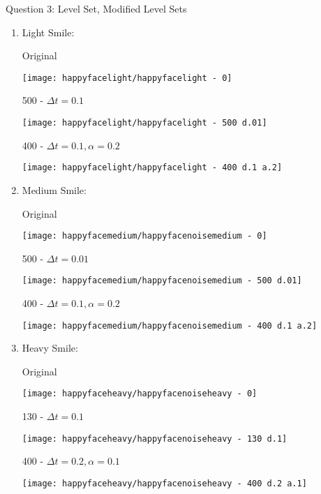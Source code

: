 \newpage
\item Question 3: Level Set, Modified Level Sets
\begin{enumerate}
  \item Light Smile:
  \begin{center}
    \begin{multicols}{3}
      Original

      \texttt{[image: happyfacelight/happyfacelight - 0]}

      500 - $\Delta t = 0.1$

      \texttt{[image: happyfacelight/happyfacelight - 500 d.01]}

      400 - $\Delta t = 0.1, \alpha = 0.2$

      \texttt{[image: happyfacelight/happyfacelight - 400 d.1 a.2]}
    \end{multicols}
  \end{center}

  \item Medium Smile:
  \begin{center}
    \begin{multicols}{3}
      Original

      \texttt{[image: happyfacemedium/happyfacenoisemedium - 0]}

      500 - $\Delta t = 0.01$

      \texttt{[image: happyfacemedium/happyfacenoisemedium - 500 d.01]}

      400 - $\Delta t = 0.1, \alpha = 0.2$

      \texttt{[image: happyfacemedium/happyfacenoisemedium - 400 d.1 a.2]}
    \end{multicols}
  \end{center}

  \item Heavy Smile:
  \begin{center}
    \begin{multicols}{3}
      Original

      \texttt{[image: happyfaceheavy/happyfacenoiseheavy - 0]}

      130 - $\Delta t = 0.1$

      \texttt{[image: happyfaceheavy/happyfacenoiseheavy - 130 d.1]}

      400 - $\Delta t = 0.2, \alpha = 0.1$

      \texttt{[image: happyfaceheavy/happyfacenoiseheavy - 400 d.2 a.1]}
    \end{multicols}
  \end{center}
\end{enumerate}
